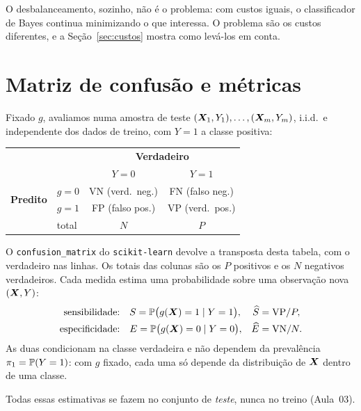 \documentclass[11pt,a4paper]{article}
\begin{document}
\begin{atencao}
O desbalanceamento, sozinho, não é o problema: com custos iguais, o classificador de
Bayes continua minimizando o que interessa. O problema são os custos diferentes, e a
Seção~\ref{sec:custos} mostra como levá-los em conta.
\end{atencao}

\section{Matriz de confusão e métricas}
Fixado $g$, avaliamos numa amostra de teste $(\bm{X}_1,Y_1),\dots,(\bm{X}_m,Y_m)$, i.i.d.\ e
independente dos dados de treino, com $Y=1$ a classe positiva:
\begin{center}\small
\renewcommand{\arraystretch}{1.3}
\begin{tabular}{@{}ll cc@{}}
\toprule
 & & \multicolumn{2}{c}{\textbf{Verdadeiro}} \\
 & & $Y=0$ & $Y=1$ \\
\midrule
\multirow{2}{*}{\textbf{Predito}} & $g=0$ & VN (verd.\ neg.) & FN (falso neg.) \\
                                  & $g=1$ & FP (falso pos.) & VP (verd.\ pos.) \\
\midrule
 & total & $N$ & $P$ \\
\bottomrule
\end{tabular}
\end{center}
O \texttt{confusion\_matrix} do \texttt{scikit-learn} devolve a transposta desta
tabela, com o verdadeiro nas linhas. Os totais das colunas são os $P$ positivos e os
$N$ negativos verdadeiros. Cada medida estima uma probabilidade sobre uma observação
nova $(\bm{X},Y)$:
\begin{align*}
  \text{sensibilidade:}\quad & S=\mathbb{P}\big(g(\bm{X})=1\mid Y=1\big),
    & \widehat S&=\text{VP}/P,\\
  \text{especificidade:}\quad & E=\mathbb{P}\big(g(\bm{X})=0\mid Y=0\big),
    & \widehat E&=\text{VN}/N.
\end{align*}
As duas condicionam na classe verdadeira e não dependem da prevalência
$\pi_1=\mathbb{P}(Y=1)$: com $g$ fixado, cada uma só depende da distribuição de $\bm{X}$
dentro de uma classe.

\begin{atencao}
Todas essas estimativas se fazem no conjunto de \emph{teste}, nunca no treino
(Aula~03).
\end{atencao}
\end{document}
